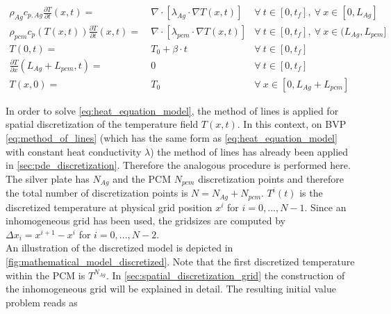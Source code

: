 \documentclass{scrartcl}[12pt, halfparskip]
\numberwithin{equation}{section}
\numberwithin{figure}{section}
\numberwithin{table}{section}
\begin{document}
\begin{subequations}
	\begin{align}
	\rho_{Ag} c_{p,Ag} \frac{\partial T}{\partial t}(x,t) = \ & \nabla \cdot \left[\lambda_{Ag} \cdot \nabla T(x,t)  \right] & \forall \ t \in [0,t_f], \ \forall \ x \in [0,L_{Ag}] \label{eq:heat_equation_Ag} \\
	\rho_{pcm} c_p(T(x,t)) \frac{\partial T}{\partial t}(x,t) = \ & \nabla \cdot \left[\lambda_{pcm} \cdot \nabla T(x,t)  \right]  & \forall \ t \in [0,t_f], \ \forall \ x \in (L_{Ag},L_{pcm}] \label{eq:heat_equation_PCM}  \\
	T(0,t) = \ & T_0 + \beta \cdot t & \forall \ t \in [0,t_f] \label{eq:heat_equation_BC_dirichlet} \\
	\frac{\partial T}{\partial x} (L_{Ag} + L_{pcm},t) = \ & 0 & \forall \ t \in [0,t_f] \label{eq:heat_equation_BC_Neumann}  \\
	T(x,0) = \ & T_0 & \forall \ x \in [0,L_{Ag} + L_{pcm}] \label{eq:heat_equation_start_values} 
	\end{align}
	\label{eq:heat_equation_model}
\end{subequations}


In order to solve \cref{eq:heat_equation_model}, the method of lines is applied for spatial discretization of the temperature field $T(x,t)$. 
In this context, on BVP \cref{eq:method_of_lines} (which has the same form as \cref{eq:heat_equation_model} with constant heat conductivity $\lambda$) the method of lines has already been applied in \cref{sec:pde_discretization}.
Therefore the analogous procedure is performed here. \\
The silver plate has $N_{Ag}$ and the PCM $N_{pcm}$ discretization points and therefore the total number of discretization points is $N = N_{Ag} + N_{pcm}$. $T^i(t)$ is the discretized temperature at physical grid position $x^i$ for $i=0,...,N-1$. Since an inhomogeneous grid has been used, the gridsizes are computed by $\Delta x_i = {x^{i+1} - x^i}$ for $i=0,...,N-2$. \\
An illustration of the discretized model is depicted in \cref{fig:mathematical_model_discretized}. Note that the first discretized temperature within the PCM is $T^{N_{Ag}}$.
In \cref{sec:spatial_discretization_grid} the construction of the inhomogeneous grid will be explained in detail. The resulting initial value problem reads as
\end{document}
